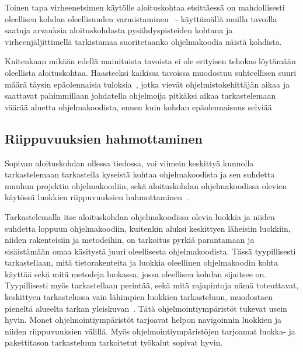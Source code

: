 \documentclass[finnish]{../tktltiki2}
\theoremstyle{definition}
\theoremstyle{remark}
\begin{document}
Toinen tapa virheenetsimen käytölle aloituskohtaa etsittäessä on mahdollisesti oleellisen kohdan oleellisuuden varmistaminen~\cite{eliciting-design-requirements-for-maintenance-oriented-ides} - käyttämällä muilla tavoilla saatuja arvauksia aloituskohdasta pysähdyspisteiden kohtana ja virheenjäljittimellä tarkistamaa suoritetaanko ohjelmakoodia näistä kohdista.

Kuitenkaan mikään edellä mainituista tavoista ei ole erityisen tehokas löytämään oleellista aloituskohtaa. Haasteeksi kaikissa tavoissa muodostuu suhteellisen suuri määrä täysin epäolennaisia tuloksia~\cite{eliciting-design-requirements-for-maintenance-oriented-ides}, jotka vievät ohjelmistokehittäjän aikaa ja saattavat pahimmillaan johdatella ohjelmoija pitkäksi aikaa tarkastelemaan väärää aluetta ohjelmakoodista, ennen kuin kohdan epäolennaisuus selviää

\subsection{Riippuvuuksien hahmottaminen}
Sopivan aloituskohdan ollessa tiedossa, voi viimein keskittyä kunnolla tarkastelemaan tarkastella kyseistä kohtaa ohjelmakoodista ja sen suhdetta muuhun projektin ohjelmakoodiin, sekä aloituskohdan ohjelmakoodissa olevien käytössä luokkien riippuvuuksien hahmottaminen~\cite{questions-during-software-evolution-tasks}. %

Tarkastelemalla itse aloituskohdan ohjelmakoodissa olevia luokkia ja niiden suhdetta loppuun ohjelmakoodiin, kuitenkin aluksi keskittyen läheisiin luokkiin, niiden rakenteisiin ja metodeihin, on tarkoitus pyrkiä parantamaan ja sisäistämään omaa käsitystä juuri oleellisesta ohjelmakoodista. Tässä tyypillisesti tarkastellaan, mitä tietorakenteita ja luokkia oleellinen ohjelmakoodin kohta käyttää sekä mitä metodeja luokassa, jossa oleellisen kohdan sijaitsee on. Tyypillisesti myös tarkastellaan perintää, sekä mitä rajapintoja nämä toteuttavat, keskittyen tarkastelussa vain lähimpien luokkien tarkasteluun, muodostaen pieneltä alueelta tarkan yleiskuvan~\cite{questions-during-software-evolution-tasks}.
Tätä ohjelmointiympäristöt tukevat usein hyvin. Monet ohjelmointiympäristöt tarjoavat helpon navigoinnin luokkien ja niiden riippuvuuksien välillä. Myös ohjelmointiympäristöjen tarjoamat luokka- ja pakettitason tarkasteluun tarkoitetut työkalut sopivat hyvin.
\end{document}
